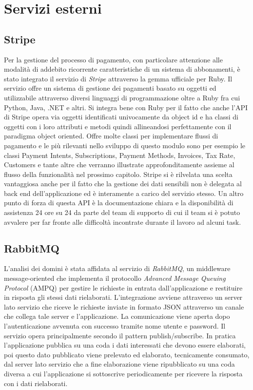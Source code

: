 \documentclass[target=bach,aauheader=,style=]{thud}
\begin{document}
\section{Servizi esterni}
\subsection{Stripe}
Per la gestione del processo di pagamento, con particolare attenzione alle modalità di addebito ricorrente caratteristiche di un sistema di abbonamenti,
è stato integrato il servizio di \textit{Stripe}\cite{stripe} attraverso la gemma ufficiale per Ruby\cite{stripe_ruby_gem}. Il servizio offre un sistema di gestione dei pagamenti
basato su oggetti ed utilizzabile attraverso diversi linguaggi di programmazione oltre a Ruby fra cui Python, Java, .NET e altri. Si integra
bene con Ruby per il fatto che anche l'API di Stripe opera via oggetti identificati univocamente da object id e ha classi di oggetti con i loro attributi e metodi quindi allineandosi
perfettamente con il paradigma object oriented.
Offre molte classi per implementare flussi di pagamento e le più rilevanti nello sviluppo di questo modulo sono per esempio le classi Payment Intents, Subscriptions, Payment Methods,
Invoices, Tax Rate, Customers e tante altre che verranno illustrate approfonditamente assieme al flusso della funzionalità nel prossimo capitolo.
Stripe si è rilvelata una scelta vantaggiosa anche per il fatto che la gestione dei dati sensibili non è delegata al back end dell'applicazione ed è interamente
a carico del servizio stesso. Un altro punto di forza di questa API è la documentazione chiara\cite{stripe_api_reference} e la disponibilità di assistenza 24 ore su 24 da parte
del team di supporto di cui il team si è potuto avvalere per far fronte alle difficoltà incontrate durante il lavoro ad alcuni task.
\subsection{RabbitMQ}
L'analisi dei domini è stata affidata al servizio di \textit{RabbitMQ}\cite{rabbitmq}, un middleware message-oriented che implementa il protocollo \textit{Advanced Message Queuing Protocol}
(AMPQ) per gestire le richieste in entrata dall'applicazione e restituire in risposta gli stessi dati rielaborati.
L'integrazione avviene attraverso un server lato servizio che riceve le richieste inviate in formato JSON attraverso un canale che collega tale server e l'applicazione.
La comunicazione viene aperta dopo l'autenticazione avvenuta con successo tramite nome utente e password.
Il servizio opera principalmente secondo il pattern publish/subscribe. In pratica l'applicazione pubblica su una coda i dati interessati che devono essere elaborati,
poi questo dato pubblicato viene prelevato ed elaborato, tecnicamente consumato, dal server lato servizio che a fine elaborazione viene ripubblicato su una coda diversa
a cui l'applicazione si sottoscrive periodicamente per ricevere la risposta con i dati rielaborati.
\end{document}
